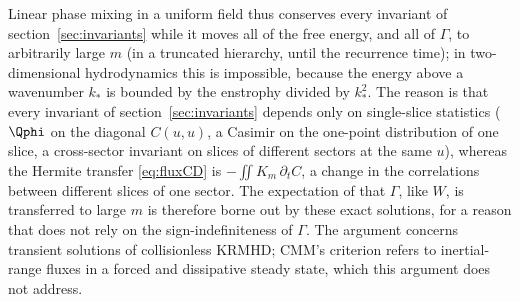 Linear phase mixing in a uniform field thus conserves every invariant of section~\ref{sec:invariants} while it moves all of the free energy, and all of $\Gamma$, to arbitrarily large $m$ (in a truncated hierarchy, until the recurrence time); in two-dimensional hydrodynamics this is impossible, because the energy above a wavenumber $k_*$ is bounded by the enstrophy divided by $k_*^2$. The reason is that every invariant of section~\ref{sec:invariants} depends only on single-slice statistics ($\Qphi$ on the diagonal $C(u,u)$, a Casimir on the one-point distribution of one slice, a cross-sector invariant on slices of different sectors at the same $u$), whereas the Hermite transfer \eqref{eq:fluxCD} is $-\iint K_m\,\partial_tC$, a change in the correlations between different slices of one sector. The expectation of \citet{Chandran2026} that $\Gamma$, like $W$, is transferred to large $m$ is therefore borne out by these exact solutions, for a reason that does not rely on the sign-indefiniteness of $\Gamma$. The argument concerns transient solutions of collisionless KRMHD; CMM's criterion refers to inertial-range fluxes in a forced and dissipative steady state, which this argument does not address.
